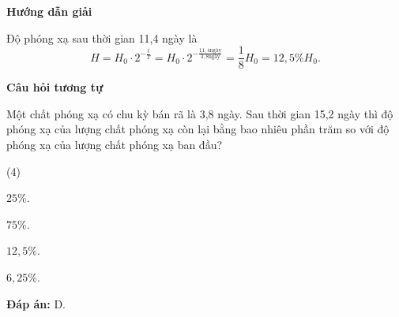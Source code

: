 	{\begin{center}
		\textbf{Hướng dẫn giải}
	\end{center}
	
	Độ phóng xạ sau thời gian 11,4 ngày là
	\begin{equation*}
	H=H_0\cdot 2^{-\frac{t}{T}}=H_0\cdot 2^{-\frac{11,4\textrm{ngày}}{3,8\textrm{ngày}}}=\dfrac{1}{8}H_0=12,5\%H_0.
	\end{equation*}
	
	\begin{center}
		\textbf{Câu hỏi tương tự}
	\end{center}
	
	Một chất phóng xạ có chu kỳ bán rã là 3,8 ngày. Sau thời gian 15,2 ngày thì độ phóng xạ của lượng chất phóng xạ còn lại bằng bao nhiêu phần trăm so với độ phóng xạ của lượng chất phóng xạ ban đầu?
\begin{mcq}(4)
	\item $25\%$.
	\item $75\%$.
	\item $12,5\%$.
	\item $6,25\%$.
\end{mcq}

	\textbf{Đáp án:} D.}
	
